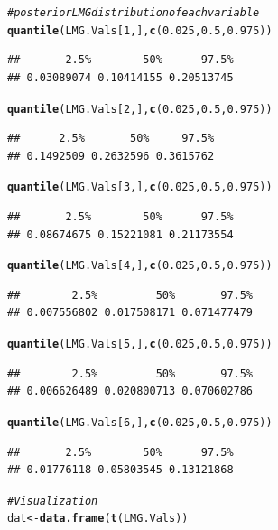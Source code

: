 \documentclass[11pt,a4paper,twoside]{book}\usepackage[]{graphicx}\usepackage[]{color}
\makeatletter
\newcommand{\hlnum}[1]{\textcolor[rgb]{0.686,0.059,0.569}{#1}}%
\newcommand{\hlcom}[1]{\textcolor[rgb]{0.678,0.584,0.686}{\textit{#1}}}%
\newcommand{\hlstd}[1]{\textcolor[rgb]{0.345,0.345,0.345}{#1}}%
\newcommand{\hlkwb}[1]{\textcolor[rgb]{0.69,0.353,0.396}{#1}}%
\newcommand{\hlkwd}[1]{\textcolor[rgb]{0.737,0.353,0.396}{\textbf{#1}}}%
\newenvironment{kframe}{%
 \def\at@end@of@kframe{}%
 \ifinner\ifhmode%
  \def\at@end@of@kframe{\end{minipage}}%
  \begin{minipage}{\columnwidth}%
 \fi\fi%
 \def\FrameCommand##1{\hskip\@totalleftmargin \hskip-\fboxsep
 \colorbox{shadecolor}{##1}\hskip-\fboxsep
     \hskip-\linewidth \hskip-\@totalleftmargin \hskip\columnwidth}%
 \MakeFramed {\advance\hsize-\width
   \@totalleftmargin\z@ \linewidth\hsize
   \@setminipage}}%
 {\par\unskip\endMakeFramed%
 \at@end@of@kframe}
\newenvironment{knitrout}{}{} %
\makeatother
\begin{document}
\begin{knitrout}
\begin{kframe}
\begin{alltt}
\hlcom{# posterior LMG distribution of each variable}
\hlkwd{quantile}\hlstd{(LMG.Vals[}\hlnum{1}\hlstd{,],} \hlkwd{c}\hlstd{(}\hlnum{0.025}\hlstd{,} \hlnum{0.5}\hlstd{,} \hlnum{0.975}\hlstd{))}
\end{alltt}
\begin{verbatim}
##       2.5%        50%      97.5% 
## 0.03089074 0.10414155 0.20513745
\end{verbatim}
\begin{alltt}
\hlkwd{quantile}\hlstd{(LMG.Vals[}\hlnum{2}\hlstd{,],} \hlkwd{c}\hlstd{(}\hlnum{0.025}\hlstd{,} \hlnum{0.5}\hlstd{,} \hlnum{0.975}\hlstd{))}
\end{alltt}
\begin{verbatim}
##      2.5%       50%     97.5% 
## 0.1492509 0.2632596 0.3615762
\end{verbatim}
\begin{alltt}
\hlkwd{quantile}\hlstd{(LMG.Vals[}\hlnum{3}\hlstd{,],} \hlkwd{c}\hlstd{(}\hlnum{0.025}\hlstd{,} \hlnum{0.5}\hlstd{,} \hlnum{0.975}\hlstd{))}
\end{alltt}
\begin{verbatim}
##       2.5%        50%      97.5% 
## 0.08674675 0.15221081 0.21173554
\end{verbatim}
\begin{alltt}
\hlkwd{quantile}\hlstd{(LMG.Vals[}\hlnum{4}\hlstd{,],} \hlkwd{c}\hlstd{(}\hlnum{0.025}\hlstd{,} \hlnum{0.5}\hlstd{,} \hlnum{0.975}\hlstd{))}
\end{alltt}
\begin{verbatim}
##        2.5%         50%       97.5% 
## 0.007556802 0.017508171 0.071477479
\end{verbatim}
\begin{alltt}
\hlkwd{quantile}\hlstd{(LMG.Vals[}\hlnum{5}\hlstd{,],} \hlkwd{c}\hlstd{(}\hlnum{0.025}\hlstd{,} \hlnum{0.5}\hlstd{,} \hlnum{0.975}\hlstd{))}
\end{alltt}
\begin{verbatim}
##        2.5%         50%       97.5% 
## 0.006626489 0.020800713 0.070602786
\end{verbatim}
\begin{alltt}
\hlkwd{quantile}\hlstd{(LMG.Vals[}\hlnum{6}\hlstd{,],} \hlkwd{c}\hlstd{(}\hlnum{0.025}\hlstd{,} \hlnum{0.5}\hlstd{,} \hlnum{0.975}\hlstd{))}
\end{alltt}
\begin{verbatim}
##       2.5%        50%      97.5% 
## 0.01776118 0.05803545 0.13121868
\end{verbatim}
\begin{alltt}
\hlcom{#Visualization}
\hlstd{dat} \hlkwb{<-} \hlkwd{data.frame}\hlstd{(}\hlkwd{t}\hlstd{(LMG.Vals))}


\end{alltt}
\end{kframe}
\end{knitrout}
\end{document}
